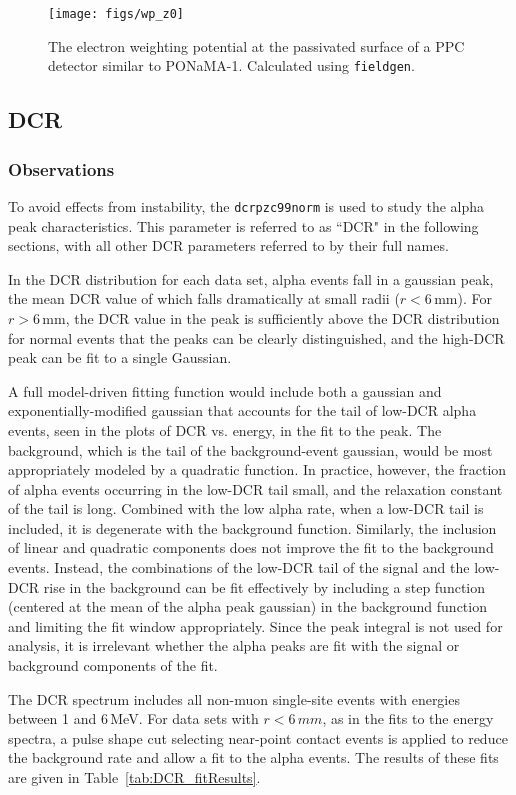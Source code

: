 \documentclass[groupedaddress,rmp,amsmath,amssymb,bibnotes,altaffilletter,twocolumn]{revtex4-1}
\begin{document}
\begin{figure}[]
 \centering
 \texttt{[image: figs/wp\_z0]}
 \caption{The electron weighting potential at the passivated surface of a PPC detector similar to PONaMA-1. Calculated using {\tt fieldgen}.} 
 \label{fig:wp_z0}
\end{figure}

\subsection{DCR}
\subsubsection{Observations}
To avoid effects from instability, the {\tt dcrpzc99norm} is used to study the alpha peak characteristics. This parameter is referred to as ``DCR" in the following sections, with all other DCR parameters referred to by their full names.

In the DCR distribution for each data set, alpha events fall in a gaussian peak, the mean DCR value of which falls dramatically at small radii ($r<6$\,mm). For $r > 6$\,mm, the DCR value in the peak is sufficiently above the DCR distribution for normal events that the peaks can be clearly distinguished, and the high-DCR peak can be fit to a single Gaussian. 

A full model-driven fitting function would include both a gaussian and exponentially-modified gaussian that accounts for the tail of low-DCR alpha events, seen in the plots of DCR vs. energy, in the fit to the peak. The background, which is the tail of the background-event gaussian, would be most appropriately modeled by a quadratic function. In practice, however, the fraction of alpha events occurring in the low-DCR tail small, and the relaxation constant of the tail is long. Combined with the low alpha rate, when a low-DCR tail is included, it is degenerate with the background function. Similarly, the inclusion of linear and quadratic components does not improve the fit to the background events. Instead, the combinations of the low-DCR tail of the signal and the low-DCR rise in the background can be fit effectively by including a step function (centered at the mean of the alpha peak gaussian) in the background function and limiting the fit window appropriately. Since the peak integral is not used for analysis, it is irrelevant whether the alpha peaks are fit with the signal or background components of the fit. 

The DCR spectrum includes all non-muon single-site events with energies between 1 and 6\,MeV. For data sets with $r<6\,mm$, as in the fits to the energy spectra, a pulse shape cut selecting near-point contact events is applied to reduce the background rate and allow a fit to the alpha events. The results of these fits are given in Table~\ref{tab:DCR_fitResults}.
\end{document}
